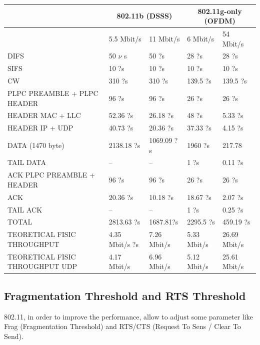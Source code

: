 	\begin{table}[h!]
		\begin{tabularx}{15cm}{ | X | X | X | X | X | }
			\hline
				 & \multicolumn{2}{|c|}{ 802.11b (DSSS)} & \multicolumn{2}{|c|}{ 802.11g-only (OFDM)} \\
				 \hline
				 & 5.5 Mbit/s & 11 Mbit/s & 6 Mbit/s & 54 Mbit/s \\
			\hline
				DIFS & 50 $\nu$ s & 50 ?s & 28 ?s & 28 ?s \\
			\hline
				SIFS & 10 ?s & 10 ?s & 10 ?s & 10 ?s \\
			\hline
				CW & 310 ?s & 310 ?s & 139.5 ?s & 139.5 ?s \\
			\hline
				PLPC PREAMBLE + PLPC HEADER & 96 ?s & 96 ?s & 26 ?s & 26 ?s \\
			\hline
				HEADER MAC + LLC & 52.36 ?s & 26.18 ?s & 48 ?s & 5.33 ?s \\
			\hline
				HEADER IP + UDP & 40.73 ?s & 20.36 ?s & 37.33 ?s & 4.15 ?s \\
			\hline
				DATA (1470 byte)& 2138.18 ?s & 1069.09 ?s & 1960 ?s & 217.78 \\
			\hline
				TAIL DATA & -- & -- & 1 ?s & 0.11 ?s \\
			\hline
				ACK PLPC PREAMBLE + HEADER & 96 ?s & 96 ?s & 26 ?s & 26 ?s \\
			\hline
				ACK & 20.36 ?s & 10.18 ?s & 18.67 ?s & 2.07 ?s \\
			\hline
				TAIL ACK & -- & -- & 1 ?s & 0.25 ?s \\
			\hline
			\hline
				TOTAL & 2813.63 ?s & 1687.81?s & 2295.5 ?s & 459.19 ?s \\
			\hline
			\hline
				TEORETICAL FISIC THROUGHPUT & 4.35 Mbit/s ?s & 7.26 Mbit/s & 5.33 Mbit/s & 26.69 Mbit/s \\
			\hline
			\hline
				TEORETICAL FISIC THROUGHPUT UDP & 4.17 Mbit/s & 6.96 Mbit/s & 5.12 Mbit/s & 25.61 Mbit/s \\
			\hline
			
		\end{tabularx}
	\end{table}
	
	
	\subsection{Fragmentation Threshold and RTS Threshold} \label{theory:frag_rts}
	
	802.11, in order to improve the performance, allow to adjust some parameter like Frag (Fragmentation Threshold) and RTS/CTS (Request To Sens / Clear To Send).\\
	
